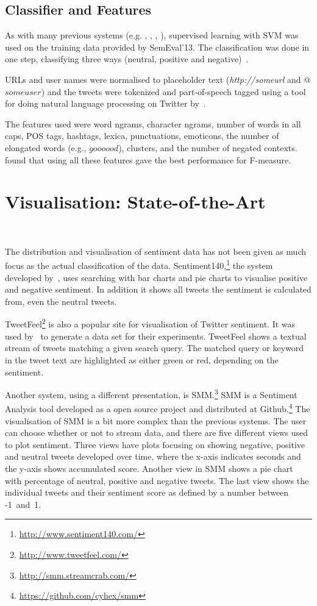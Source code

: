 \subsection{Classifier and Features}

As with many previous systems (e.g. \cite{article:bermingham}, \cite{chamlertwat2012discovering}, \cite{zhang2011combining}, \cite{asiaee2012if}), supervised learning with SVM was used on the training data provided by SemEval'13. The classification was done in one step, classifying three ways (neutral, positive and negative)~\citep{MohammadEA:13}.

URLs and user names were normalised to placeholder text (\textit{http://someurl} and  $@$$someuser$) and the tweets were tokenized and part-of-speech tagged using a tool for doing natural language processing on Twitter by~\cite{gimpel2010part}. 

The features used were word ngrams, character ngrams, number of words in all caps, POS tags, hashtags, lexica, punctuations, emoticons, the number of elongated words (e.g., $goooood$), clusters, and the number of negated contexts. \cite{MohammadEA:13} found that using all these features gave the best performance for F-measure.


\section{Visualisation: State-of-the-Art}~\label{sec:visualisation_state}

The distribution and visualisation of sentiment data has not been given as much focus as the actual classification of the data. Sentiment140,\footnote{\url{http://www.sentiment140.com/}} the system developed by~\cite{article:go}, uses searching with bar charts and pie charts to visualise positive and negative sentiment. In addition it shows all tweets the sentiment is calculated from, even the neutral tweets.

TweetFeel\footnote{\url{http://www.tweetfeel.com/}} is also a popular site for visualisation of Twitter sentiment. It was used by~\cite{barbosa2010robust} to generate a data set for their experiments. TweetFeel shows a textual stream of tweets matching a given search query. The matched query or keyword in the tweet text are highlighted as either green or red, depending on the sentiment.

Another system, using a different presentation, is SMM.\footnote{\url{http://smm.streamcrab.com/}} SMM is a Sentiment Analysis tool developed as a open source project and distributed at Github.\footnote{\url{https://github.com/cyhex/smm}} The visualisation of SMM is a bit more complex than the previous systems. The user can choose whether or not to stream data, and there are five different views used to plot sentiment. Three views have plots focusing on showing negative, positive and neutral tweets developed over time, where the x-axis indicates seconds and the y-axis shows accumulated score. Another view in SMM shows a pie chart with percentage of neutral, positive and negative tweets. The last view shows the individual tweets and their sentiment score as defined by a number between -1~and~1.

